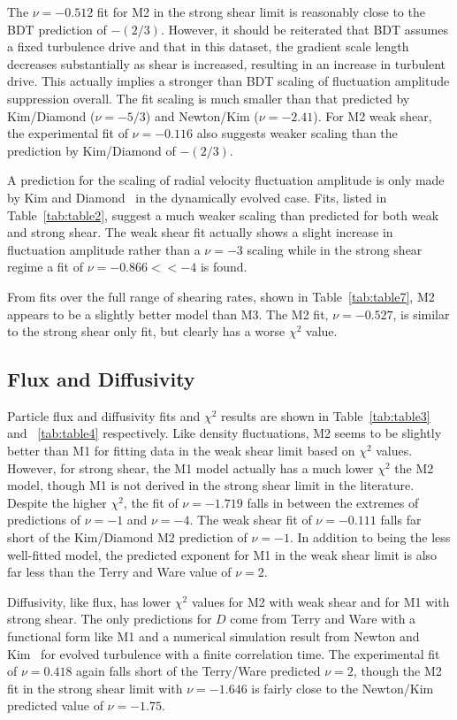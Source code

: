 \documentclass[aip,pop,amsmath,amssymb,peprint,superscriptaddress]{revtex4-1} %
\begin{document}
The $\nu = -0.512$ fit for M2 in the strong shear limit is reasonably close to the BDT prediction of $-(2/3)$. However, it should be reiterated that BDT assumes a fixed turbulence drive and that in this dataset, the gradient scale length decreases substantially as shear is increased, resulting in an increase in turbulent drive.  This actually implies a stronger than BDT scaling of fluctuation amplitude suppression overall. The fit scaling is much smaller than that predicted by Kim/Diamond ($\nu = -5/3$) and Newton/Kim ($\nu = -2.41$). For M2 weak shear, the experimental fit of $\nu = -0.116$ also suggests weaker scaling than the prediction by Kim/Diamond of $-(2/3)$.

A prediction for the scaling of radial velocity fluctuation amplitude is only made by Kim and Diamond~\cite{kim04} in the dynamically evolved case. Fits, listed in Table~\ref{tab:table2}, suggest a much weaker scaling than predicted for both weak and strong shear. The weak shear fit actually shows a slight increase in fluctuation amplitude rather than a $\nu = -3$ scaling while in the strong shear regime a fit of $\nu = -0.866 << -4$ is found.

From fits over the full range of shearing rates, shown in Table~\ref{tab:table7}, M2 appears to be a slightly better model than M3. The M2 fit, $\nu = -0.527$, is similar to the strong shear only fit, but clearly has a worse $\chi^{2}$ value.

\subsection{Flux and Diffusivity}

Particle flux and diffusivity fits and $\chi^{2}$ results are shown in Table~\ref{tab:table3} and ~\ref{tab:table4} respectively. Like density fluctuations, M2 seems to be slightly better than M1 for fitting data in the weak shear limit based on $\chi^{2}$ values.  However, for strong shear, the M1 model actually has a much lower $\chi^{2}$ the M2 model, though M1 is not derived in the strong shear limit in the literature. Despite the higher $\chi^{2}$, the fit of $\nu = -1.719$ falls in between the extremes of predictions of $\nu = -1$ and $\nu = -4$. The weak shear fit of $\nu = -0.111$ falls far short of the Kim/Diamond M2 prediction of $\nu = -1$. In addition to being the less well-fitted model, the predicted exponent for M1 in the weak shear limit is also far less than the Terry and Ware value of $\nu = 2$.

Diffusivity, like flux, has lower $\chi^{2}$ values for M2 with weak shear and for M1 with strong shear. The only predictions for $D$ come from Terry and Ware with a functional form like M1 and a numerical simulation result from Newton and Kim~\cite{newton11} for evolved turbulence with a finite correlation time. The experimental fit of $\nu = 0.418$ again falls short of the Terry/Ware predicted $\nu = 2$, though the M2 fit in the strong shear limit with $\nu = -1.646$ is fairly close to the Newton/Kim predicted value of $\nu = -1.75$.
\end{document}
